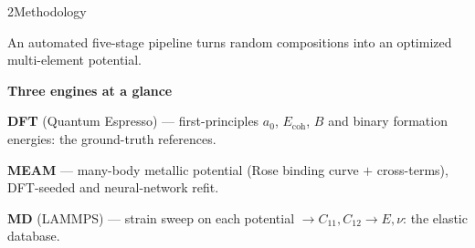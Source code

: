 \documentclass[a0,portrait]{a0poster}
\newcounter{tab}
\newlength{\colheight}\setlength{\colheight}{879mm}
\begin{document}
\begin{minipage}[t]{0.323\textwidth}\vspace{0pt}
\begin{poscol}{2\quad Methodology}
\begin{minipage}[t][\colheight][s]{\linewidth}
An automated five-stage pipeline turns random compositions into an
optimized multi-element potential.

\begin{methodsbox}
{\color{accent}\bfseries Three engines at a glance}
\begin{tight}
  \item \textbf{DFT} (Quantum Espresso) --- first-principles $a_0$,
        $E_{\mathrm{coh}}$, $B$ and binary formation energies: the
        ground-truth references.
  \item \textbf{MEAM} --- many-body metallic potential (Rose binding curve
        $+$ cross-terms), DFT-seeded and neural-network refit.
  \item \textbf{MD} (LAMMPS) --- strain sweep on each potential
        $\to C_{11},C_{12}\to E,\nu$: the elastic database.
\end{tight}
\end{methodsbox}


\end{minipage}
\end{poscol}
\end{minipage}
\end{document}
